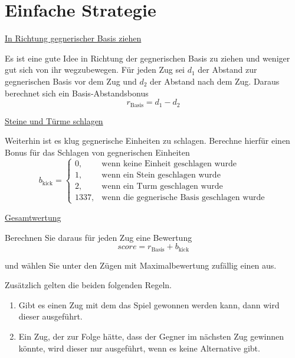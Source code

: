 \hypertarget{strategy}{\section*{Einfache Strategie}}
\underline{In Richtung gegnerischer Basis ziehen}

Es ist eine gute Idee in Richtung der gegnerischen Basis zu ziehen und weniger gut sich von ihr wegzubewegen. Für jeden Zug sei $d_1$ der Abstand zur gegnerischen Basis vor dem Zug und $d_2$ der Abstand nach dem Zug. Daraus berechnet sich ein Basis-Abstandsbonus \[r_\text{Basis} = d_1 - d_2\]

\underline{Steine und Türme schlagen}

Weiterhin ist es klug gegnerische Einheiten zu schlagen. Berechne hierfür einen Bonus für das Schlagen von gegnerischen Einheiten \[b_\text{kick} = \begin{cases}
0, & \text{wenn keine Einheit geschlagen wurde} \\
1, & \text{wenn ein Stein geschlagen wurde} \\
2, & \text{wenn ein Turm geschlagen wurde} \\
1337, & \text{wenn die gegnerische Basis geschlagen wurde}
\end{cases}\]

\underline{Gesamtwertung}

Berechnen Sie daraus für jeden Zug eine Bewertung
\[score = r_\text{Basis} + b_\text{kick}\]

und wählen Sie unter den Zügen mit Maximalbewertung zufällig einen aus.

\bigskip

Zusätzlich gelten die beiden folgenden Regeln.
\begin{enumerate}[label=\alph*)]
\item Gibt es einen Zug mit dem das Spiel gewonnen werden kann, dann wird dieser ausgeführt.
\item Ein Zug, der zur Folge hätte, dass der Gegner im nächsten Zug gewinnen könnte, wird dieser nur ausgeführt, wenn es keine Alternative gibt.
\end{enumerate}
